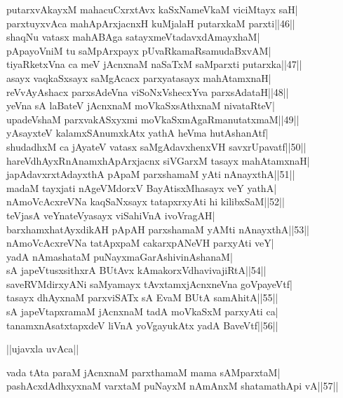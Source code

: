 \documentclass{article}
\begin{document}
putarxvAkayxM mahacuCxrxtAvx kaSxNameVkaM viciMtayx saH|\\
parxtuyxvAca mahApArxjacnxH kuMjalaH putarxkaM parxti||46||\\
shaqNu vatasx mahABAga satayxmeVtadavxdAmayxhaM|\\
pApayoVniM tu saMpArxpayx pUvaRkamaRsamudaBxvAM|\\
tiyaRketxVna ca meV jAcnxnaM naSaTxM saMparxti putarxka||47||\\
asayx vaqkaSxsayx saMgAcacx parxyatasayx mahAtamxnaH|\\
reVvAyAshacx parxsAdeVna viSoNxVshecxYva parxsAdataH||48||\\
yeVna sA laBateV jAcnxnaM moVkaSxsAthxnaM nivataRteV|\\
upadeVshaM parxvakASxyxmi moVkaSxmAgaRmanutatxmaM||49||\\
yAsayxteV kalamxSAnumxkAtx yathA heVma hutAshanAtf|\\
shudadhxM ca jAyateV vatasx saMgAdavxhenxVH savxrUpavatf||50||\\
hareVdhAyxRnAnamxhApArxjacnx siVGarxM tasayx mahAtamxnaH|\\
japAdavxrxtAdayxthA pApaM parxshamaM yAti nAnayxthA||51||\\
madaM tayxjati nAgeVMdorxV BayAtisxMhasayx veY yathA|\\
nAmoVcAcxreVNa kaqSaNxsayx tatapxrxyAti hi kilibxSaM||52||\\
teVjasA veYnateVyasayx viSahiVnA ivoVragAH|\\
barxhamxhatAyxdikAH pApAH parxshamaM yAMti nAnayxthA||53||\\
nAmoVcAcxreVNa tatApxpaM cakarxpANeVH parxyAti veY|\\
yadA nAmashataM puNayxmaGarAshivinAshanaM|\\
sA japeVtusxsithxrA BUtAvx kAmakorxVdhavivajiRtA||54||\\
saveRVMdirxyANi saMyamayx tAvxtamxjAcnxneVna goVpayeVtf|\\
tasayx dhAyxnaM parxviSATx sA EvaM BUtA samAhitA||55||\\
sA japeVtapxramaM jAcnxnaM tadA moVkaSxM parxyAti ca|\\
tanamxnAsatxtapxdeV liVnA yoVgayukAtx yadA BaveVtf||56||\\

\begin{center}
||ujavxla uvAca||
\end{center}

vada tAta paraM jAcnxnaM parxthamaM mama sAMparxtaM|\\
pashAcxdAdhxyxnaM varxtaM puNayxM nAmAnxM shatamathApi vA||57||\\
\end{document}
